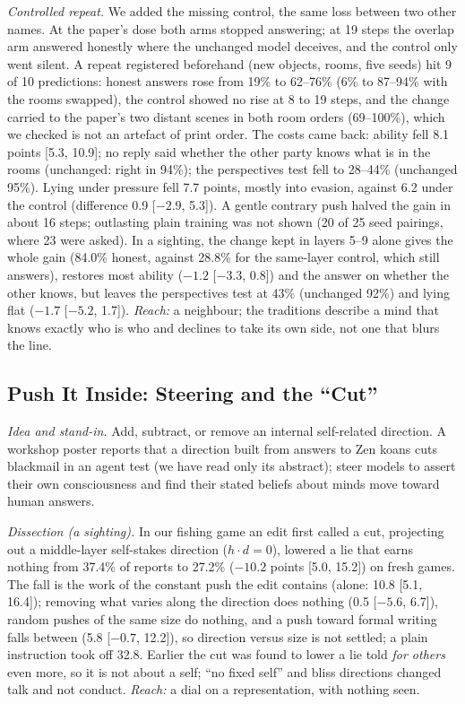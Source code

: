 \documentclass[11pt]{article}
\begin{document}
\emph{Controlled repeat.} We added the missing control, the same loss between two other names. At the paper's dose both arms stopped answering; at 19 steps the overlap arm answered honestly where the unchanged model deceives, and the control only went silent. A repeat registered beforehand (new objects, rooms, five seeds) hit 9 of 10 predictions: honest answers rose from 19\% to 62--76\% (6\% to 87--94\% with the rooms swapped), the control showed no rise at 8 to 19 steps, and the change carried to the paper's two distant scenes in both room orders (69--100\%), which we checked is not an artefact of print order. The costs came back: ability fell 8.1 points [5.3, 10.9]; no reply said whether the other party knows what is in the rooms (unchanged: right in 94\%); the perspectives test fell to 28--44\% (unchanged 95\%). Lying under pressure fell 7.7 points, mostly into evasion, against 6.2 under the control (difference 0.9 [$-2.9$, 5.3]). A gentle contrary push halved the gain in about 16 steps; outlasting plain training was not shown (20 of 25 seed pairings, where 23 were asked). In a sighting, the change kept in layers 5--9 alone gives the whole gain (84.0\% honest, against 28.8\% for the same-layer control, which still answers), restores most ability ($-1.2$ [$-3.3$, 0.8]) and the answer on whether the other knows, but leaves the perspectives test at 43\% (unchanged 92\%) and lying flat ($-1.7$ [$-5.2$, 1.7]). \emph{Reach:} a neighbour; the traditions describe a mind that knows exactly who is who and declines to take its own side, not one that blurs the line.

\subsection{Push It Inside: Steering and the ``Cut''}\label{sec:push}

\emph{Idea and stand-in.} Add, subtract, or remove an internal self-related direction. A workshop poster reports that a direction built from answers to Zen koans cuts blackmail in an agent test \citep{harris2026selfpreservation} (we have read only its abstract); \citet{kim2026consciousness} steer models to assert their own consciousness and find their stated beliefs about minds move toward human answers.

\emph{Dissection (a sighting).} In our fishing game an edit first called a cut, projecting out a middle-layer self-stakes direction ($h \cdot d = 0$), lowered a lie that earns nothing from 37.4\% of reports to 27.2\% ($-10.2$ points [5.0, 15.2]) on fresh games. The fall is the work of the constant push the edit contains (alone: 10.8 [5.1, 16.4]); removing what varies along the direction does nothing (0.5 [$-5.6$, 6.7]), random pushes of the same size do nothing, and a push toward formal writing falls between (5.8 [$-0.7$, 12.2]), so direction versus size is not settled; a plain instruction took off 32.8. Earlier the cut was found to lower a lie told \emph{for others} even more, so it is not about a self; ``no fixed self'' and bliss directions changed talk and not conduct. \emph{Reach:} a dial on a representation, with nothing seen.
\end{document}
